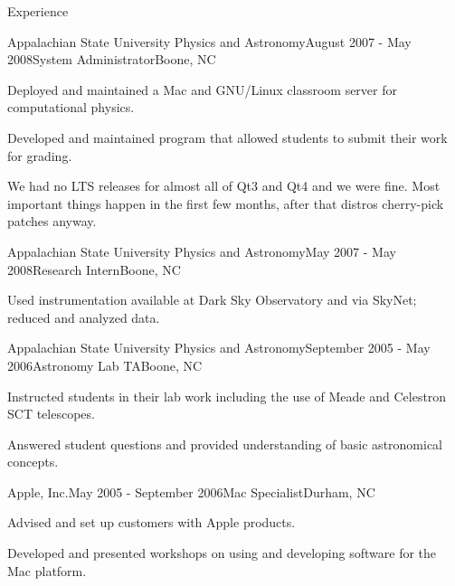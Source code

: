 \documentclass{cv} %
\begin{document}
\begin{rSection}{Experience}
\begin{rSubsection}{Appalachian State University Physics and Astronomy}{August 2007 - May 2008}{System Administrator}{Boone, NC}
\item Deployed and maintained a Mac and GNU/Linux classroom server for computational physics.
\item Developed and maintained program that allowed students to submit their work for grading.
\end{rSubsection}
We had no LTS releases for almost all of Qt3 and Qt4 and we were fine. Most important things happen in the first few months, after that distros cherry-pick patches anyway.
\begin{rSubsection}{Appalachian State University Physics and Astronomy}{May 2007 - May 2008}{Research Intern}{Boone, NC}
\item Used instrumentation available at Dark Sky Observatory and via SkyNet; reduced and analyzed data.
\end{rSubsection}

\begin{rSubsection}{Appalachian State University Physics and Astronomy}{September 2005 - May 2006}{Astronomy Lab TA}{Boone, NC}
\item Instructed students in their lab work including the use of Meade and Celestron SCT telescopes.
\item Answered student questions and provided understanding of basic astronomical concepts.
\end{rSubsection}

\begin{rSubsection}{Apple, Inc.}{May 2005 - September 2006}{Mac Specialist}{Durham, NC}
\item Advised and set up customers with Apple products.
\item Developed and presented workshops on using and developing software for the Mac platform.
\end{rSubsection}

\end{rSection}

\end{document}
